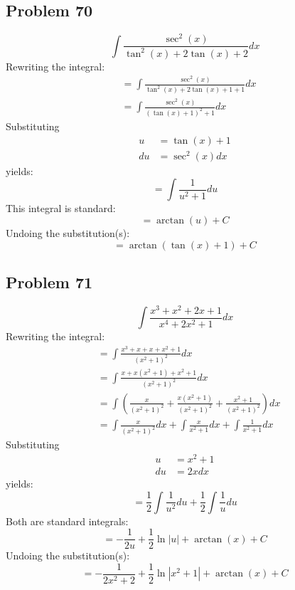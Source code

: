 \documentclass{article}
\begin{document}
\subsection*{Problem 70}
$$\int\frac{\sec^2\left(x\right)}{\tan^2\left(x\right)+2\tan\left(x\right)+2}dx$$
Rewriting the integral:
\begin{align*}
&=\int\frac{\sec^2(x)}{\tan^2(x)+2\tan(x)+1+1}dx \\
&=\int\frac{\sec^2(x)}{(\tan(x)+1)^2+1}dx
\end{align*}
Substituting
\begin{align*}
u&=\tan(x)+1 \\
du&=\sec^2(x)dx
\end{align*}
yields:
$$=\int\frac{1}{u^2+1}du$$
This integral is standard:
$$=\arctan(u)+C$$
Undoing the substitution(s):
$$=\arctan(\tan(x)+1)+C$$
\subsection*{Problem 71}
$$\int\frac{x^3+x^2+2x+1}{x^4+2x^2+1}dx$$
Rewriting the integral:
\begin{align*}
&=\int\frac{x^3+x+x+x^2+1}{(x^2+1)^2}dx \\
&=\int\frac{x+x(x^2+1)+x^2+1}{(x^2+1)^2}dx \\
&=\int\left(\frac{x}{(x^2+1)^2}+\frac{x(x^2+1)}{(x^2+1)^2}+\frac{x^2+1}{(x^2+1)^2}\right)dx \\
&=\int\frac{x}{(x^2+1)^2}dx+\int\frac{x}{x^2+1}dx+\int\frac{1}{x^2+1}dx
\end{align*}
Substituting
\begin{align*}
u&=x^2+1 \\
du&=2xdx
\end{align*}
yields:
$$=\frac{1}{2}\int\frac{1}{u^2}du+\frac{1}{2}\int\frac{1}{u}du$$
Both are standard integrals:
$$=-\frac{1}{2u}+\frac{1}{2}\ln|u|+\arctan(x)+C$$
Undoing the substitution(s):
$$=-\frac{1}{2x^2+2}+\frac{1}{2}\ln\left|x^2+1\right|+\arctan(x)+C$$
\end{document}
